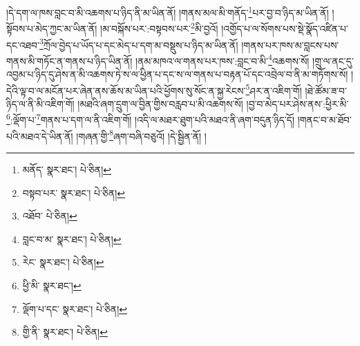 །དེ་དག་ལ་ཁས་བླང་བ་མི་འཆགས་པ་ཉིད་ནི་མ་ཡིན་ནོ། །གནས་མལ་མི་གནོད་\footnote{མནོད་  སྣར་ཐང་།  པེ་ཅིན། }པར་བྱ་བ་ཉིད་མ་ཡིན་ནོ། །སྟོབས་པ་མེད་ཀྱང་མ་ཡིན་ནོ། །མ་བསྐོས་པར་:བསྟབས་པར་\footnote{བསྟབ་པར་  སྣར་ཐང་།  པེ་ཅིན། }མི་བྱའོ། །འགྱོད་པ་ལ་སོགས་པས་སྡེ་སྣོད་འཛིན་པ་དང་འཐབ་\footnote{འཐོབ་  པེ་ཅིན། }ཀྲོལ་བྱེད་པ་ཡོད་པ་དང་མེད་པ་དག་མ་བསྡུས་པ་ཉིད་མ་ཡིན་ནོ། །གནས་པར་ཁས་མ་བླངས་པས་གནས་མི་གཏོང་ན་གནས་པ་ཉིད་ཡིན་ནོ། །ནམ་མཁའ་ལ་གནས་པར་ཁས་:བླང་བ་མི་\footnote{བླང་བ་མ་  སྣར་ཐང་།  པེ་ཅིན། }འཆགས་སོ། །གྲུ་ལ་ནང་དུ་འབྱམ་པ་ཉིད་དུ་ཤེས་ན་མི་འཆགས་ཏེ་ས་ལ་ཕྱིན་པ་དང་ས་ལ་གནས་པ་བརྟན་པོ་དང་འབྲེལ་བ་ནི་མ་གཏོགས་སོ། །དེའི་ལྟ་བ་ལ་མངོན་པར་ཞེན་ནས་ཆོས་མ་ཡིན་པའི་ཕྱོགས་སུ་སོང་ན་སྐྱ་རེངས་\footnote{རེང་  སྣར་ཐང་།  པེ་ཅིན། }ཤར་ན་འཇིག་གོ། །ཐེ་ཚོམ་ཟ་བ་ཉིད་ལ་ནི་མི་འཇིག་གོ། །མཐའི་ཞག་དྲུག་ལ་བྱིན་གྱིས་བརླབ་པ་མི་འཆགས་སོ། །བྱ་བ་མེད་པར་ཤེས་ནས་:ཕྱིར་མི་\footnote{ཕྱི་མི་  སྣར་ཐང་། }:ལྡོག་པ་\footnote{ལྡོག་པ་དང་  སྣར་ཐང་།  པེ་ཅིན། }གནས་པ་དག་ལ་ནི་འཇིག་གོ། །འདི་ལ་མཐར་ཐུག་པའི་མཐའ་ནི་ཞག་བདུན་ཉིད་དོ། །གནང་བ་མ་ཐོབ་པའི་མཐའ་དེ་ཡིན་ནོ། །གཞན་གྱི་\footnote{གྱི་ནི་  སྣར་ཐང་།  པེ་ཅིན། }ཞག་བཞི་བཅུའོ། །དེ་སྦྱིན་ནོ། །
